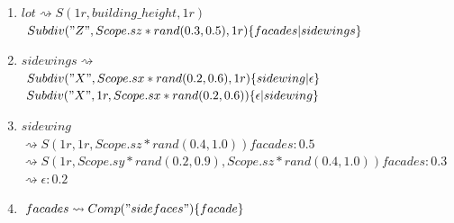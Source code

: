 \vspace{0.5cm}

\begin{enumerate}
    \item \label{itm:cga_rule_1} $lot \rightsquigarrow S(1r,building\_height,1r)$ \\
        \qquad \qquad $Subdiv("Z",Scope.sz*rand(0.3,0.5),1r)\{ facades | sidewings \}$
    \item \label{itm:cga_rule_2} $sidewings \rightsquigarrow $ \\
        \qquad \qquad $Subdiv("X",Scope.sx*rand(0.2,0.6),1r)\{ sidewing | \epsilon \}$ \\
        \qquad \qquad $Subdiv("X",1r,Scope.sx*rand(0.2,0.6))\{ \epsilon | sidewing \}$
    \item \label{itm:cga_rule_3} $sidewing$ \\
        \qquad \qquad $\rightsquigarrow S(1r,1r,Scope.sz*rand(0.4,1.0)) facades : 0.5$ \\
        \qquad \qquad $\rightsquigarrow S(1r,Scope.sy*rand(0.2,0.9),Scope.sz*rand(0.4,1.0))
    facades : 0.3$ \\
        \qquad \qquad$ \rightsquigarrow \epsilon : 0.2$
    \item \label{itm:cga_rule_4} $facades \rightsquigarrow Comp("sidefaces")\{ facade \}$
\end{enumerate}

\vspace{0.5cm}

\begin{figure}[h!]
	\centering
	\captionsetup{width=15cm}
	{}	
\end{figure}

